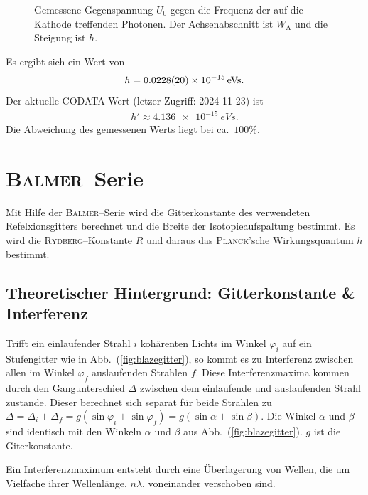 \documentclass[sn-mathphys-num,iicol]{sn-jnl}
\theoremstyle{thmstyleone}
\theoremstyle{thmstyletwo}
\theoremstyle{thmstylethree}
\begin{document}
\begin{figure}[t]
        \centering
        \resizebox{.5\textwidth}{!}{}
        \caption{Gemessene Gegenspannung $U_0$ gegen die Frequenz der auf die Kathode treffenden Photonen. Der Achsenabschnitt ist $W_\text{A}$ und die Steigung ist $h$.} \label{fig:austrittsarbeit}
\end{figure}
Es ergibt sich ein Wert von
\begin{align} 
        h=\SI{0.0228+-0.002e-15}{eVs}
.\end{align} 
Der aktuelle CODATA Wert (letzer Zugriff: 2024-11-23) ist
\begin{align} 
        h'\approx \SI{4.136e-15}{eVs}
.\end{align} 
Die Abweichung des gemessenen Werts liegt bei ca.\ $100\%$.

\section{\textsc{Balmer}--Serie}
Mit Hilfe der \textsc{Balmer}--Serie wird die Gitterkonstante des verwendeten Refelxionsgitters berechnet und die Breite der Isotopieaufspaltung bestimmt.
Es wird die \textsc{Rydberg}--Konstante $R$ und daraus das \textsc{Planck}'sche Wirkungsquantum $h$ bestimmt.

\subsection{Theoretischer Hintergrund: Gitterkonstante \& Interferenz}
Trifft ein einlaufender Strahl $i$ kohärenten Lichts im Winkel $\varphi _i$ auf ein Stufengitter wie in Abb.\ (\ref{fig:blazegitter}), so kommt es zu Interferenz zwischen allen im Winkel $\varphi _f$ auslaufenden Strahlen $f$.
Diese Interferenzmaxima kommen durch den Gangunterschied $\Delta $ zwischen dem einlaufende und auslaufenden Strahl zustande.
Dieser berechnet sich separat für beide Strahlen zu $\Delta =\Delta _i+\Delta _f=g\left(\sin \varphi _i+\sin \varphi _f\right)=g\left(\sin \alpha +\sin \beta \right)$.
Die Winkel $\alpha $ und $\beta $ sind identisch mit den Winkeln $\alpha $ und $\beta $ aus Abb.\ (\ref{fig:blazegitter}).
$g$ ist die Giterkonstante.

Ein Interferenzmaximum entsteht durch eine Überlagerung von Wellen, die um Vielfache ihrer Wellenlänge, $n \lambda $, voneinander verschoben sind.
\end{document}
